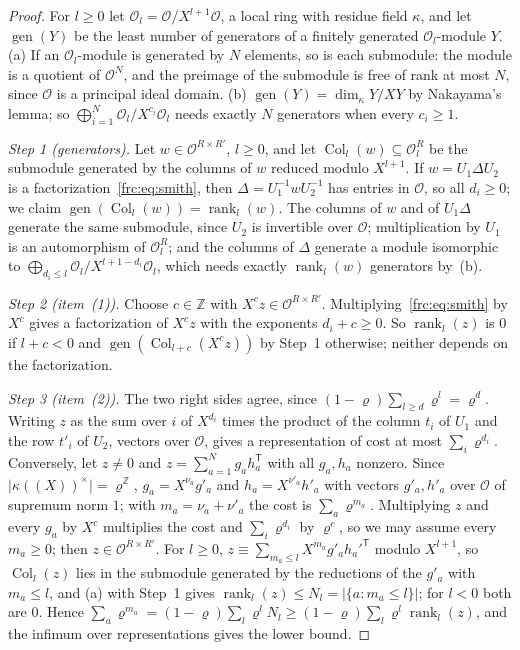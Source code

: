 \documentclass[11pt]{amsart}
\theoremstyle{definition}
\theoremstyle{remark}
\numberwithin{equation}{section}
\newcommand{\Z}{\mathbb Z}
\newcommand{\abs}[1]{\lvert #1\rvert}
\newcommand{\rank}{\operatorname{rank}}
\theoremstyle{plain}
\theoremstyle{definition}
\theoremstyle{plain}
\begin{document}
\begin{proof}
For $l\ge0$ let $\mathcal O_l=\mathcal O/X^{l+1}\mathcal O$, a local ring with residue field $\kappa$, and let
$\operatorname{gen}(Y)$ be the least number of generators of a finitely generated $\mathcal O_l$\nobreakdash-module $Y$.
(a) If an $\mathcal O_l$\nobreakdash-module is generated by $N$ elements, so is each submodule: the module is a quotient of
$\mathcal O^N$, and the preimage of the submodule is free of rank at most $N$, since $\mathcal O$ is a principal ideal
domain. (b) $\operatorname{gen}(Y)=\dim_\kappa Y/XY$ by Nakayama's lemma; so
$\bigoplus_{i=1}^N\mathcal O_l/X^{c_i}\mathcal O_l$ needs exactly $N$ generators when every $c_i\ge1$.

\emph{Step 1 (generators).} Let $w\in\mathcal O^{R\times R'}$, $l\ge0$, and let $\operatorname{Col}_l(w)\subseteq
\mathcal O_l^R$ be the submodule generated by the columns of $w$ reduced modulo $X^{l+1}$. If $w=U_1\Delta U_2$ is a
factorization~\eqref{frc:eq:smith}, then $\Delta=U_1^{-1}wU_2^{-1}$ has entries in $\mathcal O$, so all $d_i\ge0$; we
claim $\operatorname{gen}(\operatorname{Col}_l(w))=\rank_l(w)$. The columns of $w$ and of $U_1\Delta$ generate the same
submodule, since $U_2$ is invertible over $\mathcal O$; multiplication by $U_1$ is an automorphism of $\mathcal O_l^R$; and
the columns of $\Delta$ generate a module isomorphic to $\bigoplus_{d_i\le l}\mathcal O_l/X^{l+1-d_i}\mathcal O_l$, which
needs exactly $\rank_l(w)$ generators by~(b).

\emph{Step 2 (item~(1)).} Choose $c\in\Z$ with $X^cz\in\mathcal O^{R\times R'}$. Multiplying~\eqref{frc:eq:smith} by $X^c$
gives a factorization of $X^cz$ with the exponents $d_i+c\ge0$. So $\rank_l(z)$ is $0$ if $l+c<0$ and
$\operatorname{gen}(\operatorname{Col}_{l+c}(X^cz))$ by Step~1 otherwise; neither depends on the factorization.

\emph{Step 3 (item~(2)).} The two right sides agree, since $(1-\varrho)\sum_{l\ge d}\varrho^l=\varrho^d$. Writing $z$ as
the sum over $i$ of $X^{d_i}$ times the product of the column $t_i$ of $U_1$ and the row $t'_i$ of $U_2$, vectors over
$\mathcal O$, gives a representation of cost at most $\sum_i\varrho^{d_i}$. Conversely, let $z\ne0$ and
$z=\sum_{a=1}^Ng_ah_a^{\mathsf T}$ with all $g_a,h_a$ nonzero. Since $\abs{\kappa((X))^\times}=\varrho^\Z$,
$g_a=X^{\nu_a}g'_a$ and $h_a=X^{\nu'_a}h'_a$ with vectors $g'_a,h'_a$ over $\mathcal O$ of supremum norm $1$; with
$m_a=\nu_a+\nu'_a$ the cost is $\sum_a\varrho^{m_a}$. Multiplying $z$ and every $g_a$ by $X^c$ multiplies the cost and
$\sum_i\varrho^{d_i}$ by $\varrho^c$, so we may assume every $m_a\ge0$; then $z\in\mathcal O^{R\times R'}$. For $l\ge0$,
$z\equiv\sum_{m_a\le l}X^{m_a}g'_ah_a'^{\mathsf T}$ modulo $X^{l+1}$, so $\operatorname{Col}_l(z)$ lies in the submodule
generated by the reductions of the $g'_a$ with $m_a\le l$, and (a) with Step~1 gives
$\rank_l(z)\le N_l=\abs{\{a:m_a\le l\}}$; for $l<0$ both are $0$. Hence
$\sum_a\varrho^{m_a}=(1-\varrho)\sum_l\varrho^lN_l\ge(1-\varrho)\sum_l\varrho^l\rank_l(z)$, and the infimum over
representations gives the lower bound.


\end{proof}
\end{document}

